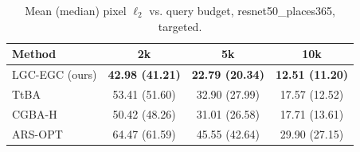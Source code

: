\begin{table}[t]
\centering\footnotesize
\caption{Mean (median) pixel $\ell_2$ vs. query budget, resnet50\_places365, targeted.}
\begin{tabular}{lccc}
\toprule
Method & 2k & 5k & 10k \\
\midrule
LGC-EGC (ours) & \textbf{42.98 (41.21)} & \textbf{22.79 (20.34)} & \textbf{12.51 (11.20)} \\
TtBA & 53.41 (51.60) & 32.90 (27.99) & 17.57 (12.52) \\
CGBA-H & 50.42 (48.26) & 31.01 (26.58) & 17.71 (13.61) \\
ARS-OPT & 64.47 (61.59) & 45.55 (42.64) & 29.90 (27.15) \\
\bottomrule
\end{tabular}
\end{table}
